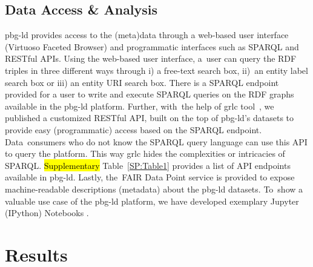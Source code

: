 \documentclass[applsci,article,accept,moreauthors,pdftex]{Definitions/mdpi}
\begin{document}
{%
\subsection{Data Access \& Analysis}
pbg-ld %
provides access to the (meta)data through a web-based user interface (Virtuoso Faceted Browser) and programmatic interfaces such as SPARQL and RESTful APIs.
Using the web-based user interface, a~user can query the RDF triples in three different ways through i) a free-text search box, ii)~an entity label search box or iii) an entity URI search box. %
There is a SPARQL endpoint provided for a user to write and execute SPARQL queries on the RDF graphs available in the pbg-ld platform. Further, with~the help of grlc tool~\cite{Merono-Penuela2016},
we published a customized RESTful API, %
built on the top of pbg-ld’s datasets to provide easy (programmatic) access based on the SPARQL endpoint.
Data~consumers who do not know the SPARQL query language can use this API %
to query the platform. This way grlc hides the complexities or intricacies of SPARQL. \hl{Supplementary} Table~\ref{SP:Table1}  %
provides a list of API endpoints %
available in pbg-ld. Lastly, the~FAIR Data Point service is provided to expose machine-readable descriptions (metadata) about the pbg-ld datasets.
To~show a valuable use case of the pbg-ld platform, %
we have developed exemplary Jupyter (IPython) Notebooks \cite{Notebooks}. %

\section{Results}
\unskip
}
\end{document}
